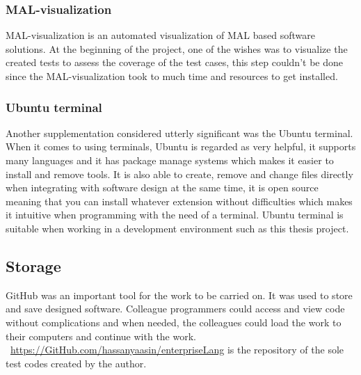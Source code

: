\documentclass[english]{kththesis}
\begin{document}
\subsubsection{\gls{MAL}-visualization}
\gls{MAL}-visualization is an automated visualization of \gls{MAL} based software solutions. At the beginning of the project, one of the wishes was to visualize the created tests to assess the coverage of the test cases, this step couldn't be done since the \gls{MAL}-visualization took to much time and resources to get installed.

\subsubsection{Ubuntu terminal}
Another supplementation considered utterly significant was the Ubuntu terminal. When it comes to using terminals, Ubuntu is regarded as very helpful, it supports many languages and it has package manage systems which makes it easier to install and remove tools. It is also able to create, remove and change files directly when integrating with software design at the same time, it is open source meaning that you can install whatever extension without difficulties which makes it intuitive when programming with the need of a terminal. Ubuntu terminal is suitable when working in a development environment such as this thesis project.

\subsection{Storage}
GitHub was an important tool for the work to be carried on. It was used to store and save designed software. Colleague programmers could access and view code without complications and when needed, the colleagues could load the work to their computers and continue with the work. ~\url{https://GitHub.com/hassanyaasin/enterpriseLang} is the repository of the sole test codes created by the author.
\end{document}
